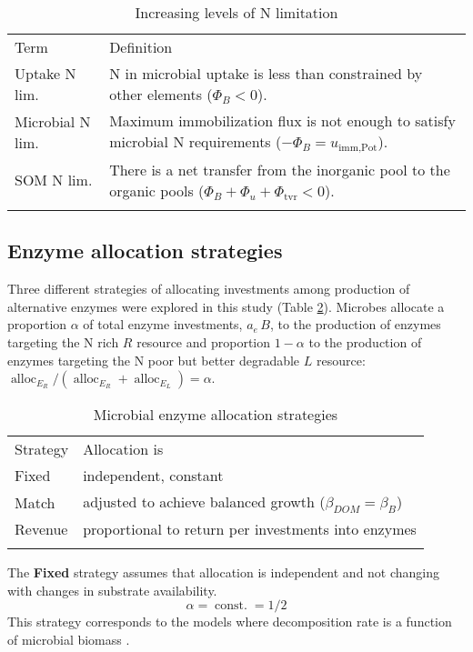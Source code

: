 \begin{table}[t]
\caption{Increasing levels of N limitation \label{tab:NutrientLimDefs}}
\centering
\begin{tabular}{lp{5.5cm}}
\tophline
Term &  Definition \\
\middlehline
Uptake N lim. & N in microbial uptake is less than 
constrained by other elements (${\Phi_B < 0}$).
\\
Microbial N lim. & Maximum immobilization flux is not enough to satisfy
microbial N requirements (${-\Phi_B =
u_{\operatorname{imm,Pot}}}$).
\\
SOM N lim. & There is a net transfer from the inorganic pool to
the organic pools (${\Phi_B+\Phi_u+\Phi_{\operatorname{tvr}}<0}$).
\\
\bottomhline
\end{tabular}
\end{table}
 



\subsection{ Enzyme allocation strategies} 
\label{sec:AllocStrategies}

Three different strategies of allocating investments among production of
alternative enzymes were explored in this study (Table
\ref{tab:AllocStrategies}). Microbes allocate a proportion $\alpha$ of total
enzyme investments, $a_e\,B$, to the production of enzymes targeting the N rich
$R$ resource and proportion $1 - \alpha$ to the production of enzymes targeting
the N poor but better degradable $L$ resource: $\operatorname{alloc}_{E_R} /
(\operatorname{alloc}_{E_R} + \operatorname{alloc}_{E_L}) = \alpha$.

\begin{table}[t]
\caption{Microbial enzyme allocation strategies \label{tab:AllocStrategies}}
\vskip4mm
\centering
\begin{tabular}{ll}
\tophline
Strategy &  Allocation is \\
\middlehline
Fixed & independent, constant \\
Match & adjusted to achieve balanced growth ($\beta_{DOM} = \beta_{B}$)  \\
Revenue & proportional to return per investments into enzymes \\
\bottomhline
\end{tabular}
\end{table}


The \textbf{Fixed} strategy assumes that allocation is independent
and not changing with changes in substrate availability.
\begin{equation} 
\label{eq:allocFixed}
\alpha = \operatorname{const.} = 1/2
\end{equation}
This strategy corresponds to the models where decomposition rate is a function
of microbial biomass \citep{Wutzler08}.
 
